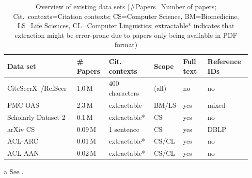 \begin{table}[tb]
 \caption[Overview of existing data sets]{Overview of existing data sets (\#Papers=Number of papers; Cit.\ contexts=Citation contexts; CS=Computer Science, BM=Biomedicine, LS=Life Sciences, CL=Computer Linguistics; extractable* indicates that extraction might be error-prone due to papers only being available in PDF format)}
 \label{tab:existing-data-sets}
  \centering
  \begin{small}
 \begin{threeparttable}
 \begin{tabular}{llllll}
 \toprule
   Data set & \#\,Papers & Cit. contexts & Scope & Full text & Reference IDs \\
   \midrule
   CiteSeerX~\cite{Caragea2014}/RefSeer~\cite{Huang2015fixed} &  1.0\,M & 400 characters & (all) & no & no \\
   PMC OAS\tnote{a} & 2.3\,M & extractable & BM/LS & yes & mixed \\
   Scholarly Dataset 2~\cite{Sugiyama2015} & 0.1\,M & extractable* & CS & yes & no \\
   arXiv CS~\cite{Faerber2018LREC}   &  0.09\,M & 1 sentence & CS & yes & DBLP \\
   ACL-ARC~\cite{Bird2008ACLARC} & 0.01\,M & extractable* & CS/CL & yes & no \\
   ACL-AAN~\cite{Radev2013} & 0.02\,M & extractable* & CS/CL & yes & no  \\
   \bottomrule
 \end{tabular}
 \begin{tablenotes}
    \item[a] See .
  \end{tablenotes}
\end{threeparttable}
  \end{small}
\end{table}

